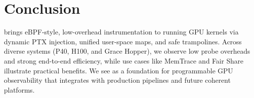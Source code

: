 \section{Conclusion}
\label{sec:conclusion}


\sys brings eBPF-style, low-overhead instrumentation to running GPU kernels via dynamic PTX injection, unified user-space maps, and safe trampolines. Across diverse systems (P40, H100, and Grace Hopper), we observe low probe overheads and strong end-to-end efficiency, while use cases like MemTrace and Fair Share illustrate practical benefits. We see \sys as a foundation for programmable GPU observability that integrates with production pipelines and future coherent platforms.
